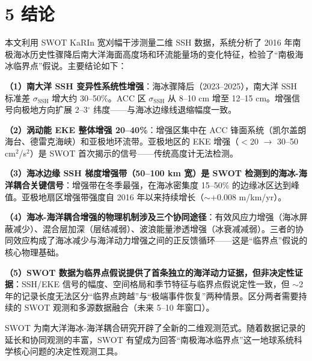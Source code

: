 \documentclass[11pt,a4paper]{article}
\begin{document}
\section*{5  结论}

本文利用 SWOT KaRIn 宽刈幅干涉测量二维 SSH 数据，系统分析了 2016 年南极海冰历史性骤降后南大洋海面高度场和环流能量场的变化特征，检验了``南极海冰临界点''假说。主要结论如下：\par

\textbf{（1）南大洋 SSH 变异性系统性增强}：海冰骤降后（2023--2025），南大洋 SSH 标准差 $\sigma_{\text{SSH}}$ 增大约 30--50\%。ACC 区 $\sigma_{\text{SSH}}$ 从 8--10 cm 增至 12--15 cm。增强信号向极地方向扩展 2--3$^\circ$ 纬度——与海冰边缘线退缩幅度一致。\par

\textbf{（2）涡动能 EKE 整体增强 20--40\%}：增强区集中在 ACC 锋面系统（凯尔盖朗海台、德雷克海峡）和亚极地环流带。亚极地区的 EKE 增强（$<$20 $\to$ 30--50 cm$^2$/s$^2$）是 SWOT 首次揭示的信号——传统高度计无法检测。\par

\textbf{（3）海冰边缘 SSH 梯度增强带（50--100 km 宽）是 SWOT 检测到的海冰-海洋耦合关键信号}：增强带在冬季最强，在海冰密集度 15--50\% 的边缘冰区达到峰值。亚极地扇区增强带强度自 2016 年以来持续增长（$\sim$+0.008 m/km/yr）。\par

\textbf{（4）海冰-海洋耦合增强的物理机制涉及三个协同途径}：有效风应力增强（海冰屏蔽减少）、混合层加深（层结减弱）、波浪能量渗透增强（冰衰减减弱）。三者的协同效应构成了海冰减少与海洋动力增强之间的正反馈循环——这是``临界点''假说的核心物理基础。\par

\textbf{（5）SWOT 数据为临界点假说提供了首条独立的海洋动力证据，但非决定性证据}：SSH/EKE 信号的幅度、空间格局和季节特征与临界点假说定性一致，但 $\sim$2 年的记录长度无法区分``临界点跨越''与``极端事件恢复''两种情景。区分两者需要持续的 SWOT 观测和多源数据融合（未来 5--10 年窗口）。\par

SWOT 为南大洋海冰-海洋耦合研究开辟了全新的二维观测范式。随着数据记录的延长和协同观测的丰富，SWOT 有望成为回答``南极海冰临界点''这一地球系统科学核心问题的决定性观测工具。\par

\newpage
\end{document}
